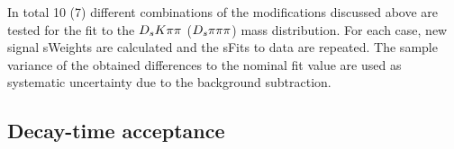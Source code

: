 %
%
%
%
%
%

In total 10 (7) different combinations of the modifications discussed above are tested for the fit to the ${{D}_{s}} {K} {\pi}{\pi}$ (${{D}_{s}} \pi {\ensuremath{\pi}}{\ensuremath{\pi}}$) mass distribution.
For each case, new signal \textsf{sWeights} are calculated and the \textsf{sFits} to data are repeated. 
The sample variance of the obtained differences to the nominal fit value are used as systematic uncertainty due to the background subtraction.


\subsection{Decay-time acceptance}
\label{subsec:SystTime}

